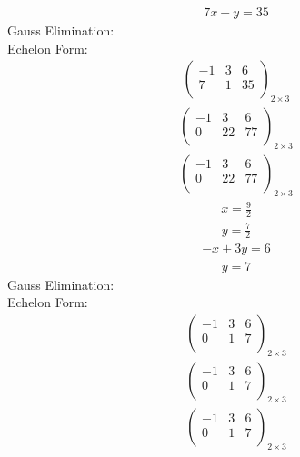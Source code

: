\documentclass{article}
\begin{document}
\begin{align*}
7x + y=35\end{align*}
Gauss Elimination:\\
Echelon Form:\\
\begin{align*}
\left(
\begin{array}{cc|c}
-1 & 3 & 6\\
7 & 1 & 35\\
\end{array}
\right)_{2\times 3}
\end{align*}
\begin{align*}
\left(
\begin{array}{cc|c}
-1 & 3 & 6\\
0 & 22 & 77\\
\end{array}
\right)_{2\times 3}
\end{align*}
\begin{align*}
\left(
\begin{array}{cc|c}
-1 & 3 & 6\\
0 & 22 & 77\\
\end{array}
\right)_{2\times 3}
\end{align*}
\begin{align*}
x=\frac{9}{2}\end{align*}
\begin{align*}
y=\frac{7}{2}\end{align*}
\begin{align*}
-x + 3y=6\end{align*}
\begin{align*}
y=7\end{align*}
Gauss Elimination:\\
Echelon Form:\\
\begin{align*}
\left(
\begin{array}{cc|c}
-1 & 3 & 6\\
0 & 1 & 7\\
\end{array}
\right)_{2\times 3}
\end{align*}
\begin{align*}
\left(
\begin{array}{cc|c}
-1 & 3 & 6\\
0 & 1 & 7\\
\end{array}
\right)_{2\times 3}
\end{align*}
\begin{align*}
\left(
\begin{array}{cc|c}
-1 & 3 & 6\\
0 & 1 & 7\\
\end{array}
\right)_{2\times 3}
\end{align*}
\end{document}
